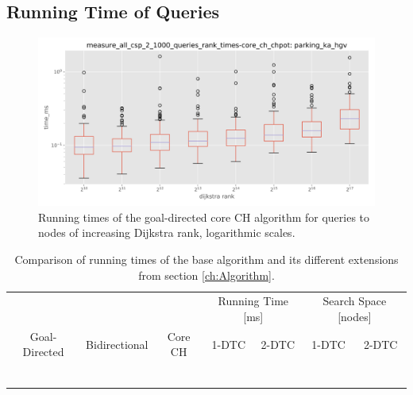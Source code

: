 \subsection{Running Time of Queries}
\begin{figure}[hbtp]
	\centering
	\includegraphics[width=.95\textwidth]{plots/measure_all_csp_2_1000_queries_rank_times-core_ch_chpot-time_ms.png}
	\caption{Running times of the goal-directed core CH algorithm for queries to nodes of increasing Dijkstra rank, logarithmic scales.}
	\label{fig:rank_times}
\end{figure}

\begin{table}[hbtp]
	\centering
	\begin{tabular}{ccccccc}
		\toprule
		              &               &         & \multicolumn{2}{c}{Running Time [\si{\milli\second}]} & \multicolumn{2}{c}{Search Space [nodes]}                 \\
		Goal-Directed & Bidirectional & Core CH & 1-DTC                                                 & 2-DTC                                    & 1-DTC & 2-DTC \\
		\midrule
		\xmark        & \xmark        & \xmark  &                                                       &                                          &       &       \\
		\cmark        & \xmark        & \xmark  &                                                       &                                          &       &       \\
		\xmark        & \cmark        & \xmark  &                                                       &                                          &       &       \\
		\cmark        & \cmark        & \xmark  &                                                       &                                          &       &       \\
		\xmark        & \cmark        & \cmark  &                                                       &                                          &       &       \\
		\cmark        & \cmark        & \cmark  &                                                       &                                          &       &       \\
		\bottomrule
	\end{tabular}
	\caption{Comparison of running times of the base algorithm and its different extensions from section \ref{ch:Algorithm}.}
	\label{tbl:extensions_runtime}
\end{table}

